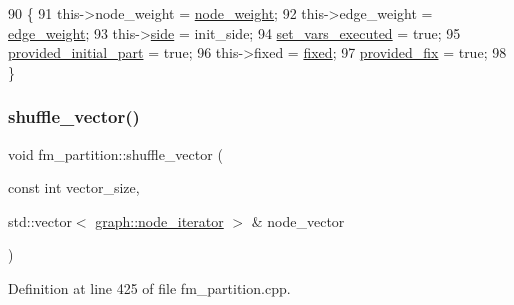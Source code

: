 \begin{DoxyCode}
90 \{
91     this->node\_weight = \mbox{\hyperlink{classfm__partition_ae1ba643b4bd6721075ab7b608bcf3cd6}{node\_weight}};
92     this->edge\_weight = \mbox{\hyperlink{classfm__partition_adfe6147ba3f9c785f613b472f950595f}{edge\_weight}};
93     this->\mbox{\hyperlink{classfm__partition_af83309e781e9658fc0ff923ced087bfc}{side}} = init\_side;
94     \mbox{\hyperlink{classfm__partition_a58edb78c4da479cd790da1eed1a30eab}{set\_vars\_executed}} = \textcolor{keyword}{true};
95     \mbox{\hyperlink{classfm__partition_a38c67abb32d7ade03b68f0a7ed9f1c6d}{provided\_initial\_part}} = \textcolor{keyword}{true};
96     this->fixed = \mbox{\hyperlink{classfm__partition_a3b04658dbb5b27ddd20194ff74a71082}{fixed}};
97     \mbox{\hyperlink{classfm__partition_a0aca0fa4fcaba284d61c745d17022f8d}{provided\_fix}} = \textcolor{keyword}{true};
98 \}
\end{DoxyCode}
\mbox{\label{classfm__partition_a27915b38800483f897647f012b935f0a}} 
\subsubsection{\texorpdfstring{shuffle\+\_\+vector()}{shuffle\_vector()}}
{\footnotesize\ttfamily void fm\+\_\+partition\+::shuffle\+\_\+vector (\begin{DoxyParamCaption}\item[{const int}]{vector\+\_\+size,  }\item[{std\+::vector$<$ \mbox{\hyperlink{classgraph_a2cb374b84c133ce13f94e73c3e5da7fa}{graph\+::node\+\_\+iterator}} $>$ \&}]{node\+\_\+vector }\end{DoxyParamCaption})\hspace{0.3cm}{\ttfamily [protected]}}



Definition at line 425 of file fm\+\_\+partition.\+cpp.


